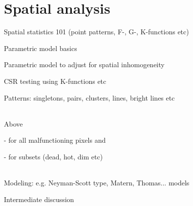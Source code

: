 \documentclass[../../IO-Pixels.tex]{subfiles}
\begin{document}
\section{Spatial analysis}
\begin{outline}
Spatial statistics 101 (point patterns, F-, G-, K-functions etc)

Parametric model basics

Parametric model to adjust for spatial inhomogeneity

CSR testing using K-functions etc

Patterns: singletons, pairs, clusters, lines, bright lines etc

\\
Above 

- for all malfunctioning pixels and 

- for subsets (dead, hot, dim etc)

\\
Modeling: e.g. Neyman-Scott type, Matern, Thomas... models

Intermediate discussion
\end{outline}

\end{document}

